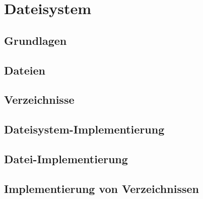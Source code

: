 \section{Dateisystem}

\subsection{Grundlagen}

\subsection{Dateien}

\subsection{Verzeichnisse}

\subsection{Dateisystem-Implementierung}

\subsection{Datei-Implementierung}

\subsection{Implementierung von Verzeichnissen}
